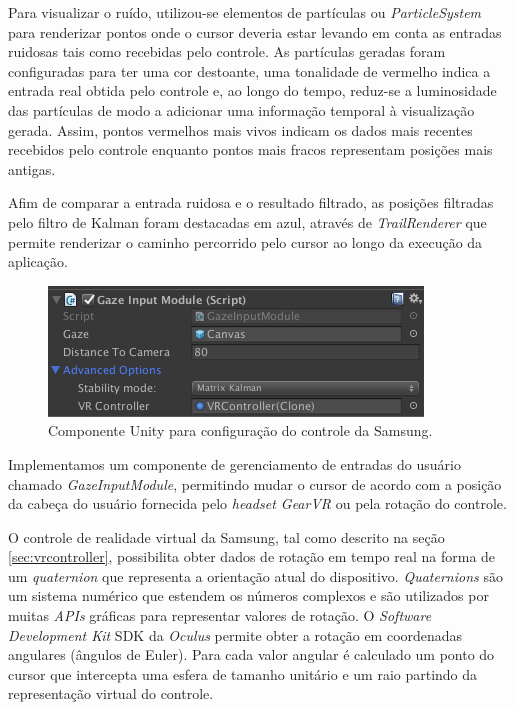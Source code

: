 \documentclass[conference]{IEEEtran}
\begin{document}
Para visualizar o ruído, utilizou-se elementos de partículas ou \textit{ParticleSystem} para renderizar pontos onde o cursor deveria estar levando em conta as entradas ruidosas tais como recebidas pelo controle. As partículas geradas foram configuradas para ter uma cor destoante, uma tonalidade de vermelho indica a entrada real obtida pelo controle e, ao longo do tempo, reduz-se a luminosidade das partículas de modo a adicionar uma informação temporal à visualização gerada. Assim, pontos vermelhos mais vivos indicam os dados mais recentes recebidos pelo controle enquanto pontos mais fracos representam posições mais antigas.

Afim de comparar a entrada ruidosa e o resultado filtrado, as posições filtradas pelo filtro de Kalman foram destacadas em azul, através de \textit{TrailRenderer} que permite renderizar o caminho percorrido pelo cursor ao longo da execução da aplicação.

\begin{figure}[ht]
\centering
\includegraphics[width=.5\textwidth]{images/controller_input.png}
\caption{Componente Unity para configuração do controle da Samsung.}
\label{fig:controllercomponent}
\end{figure}

Implementamos um componente de gerenciamento de entradas do usuário chamado \textit{GazeInputModule}, permitindo mudar o cursor de acordo com a posição da cabeça do usuário fornecida pelo \textit{headset GearVR} ou pela rotação do controle.


O controle de realidade virtual da Samsung, tal como descrito na seção \ref{sec:vrcontroller}, possibilita obter dados de rotação em tempo real \cite{gearvrinputdocs} na forma de um \textit{quaternion} \cite{quaternionhamilton1844ii} que representa a orientação atual do dispositivo. \textit{Quaternions} são um sistema numérico que estendem os números complexos e são utilizados por muitas \textit{APIs} gráficas para representar valores de rotação. O \textit{Software Development Kit} SDK da \textit{Oculus} permite obter a rotação em coordenadas angulares (ângulos de Euler). Para cada valor angular é calculado um ponto do cursor que intercepta uma esfera de tamanho unitário e um raio partindo da representação virtual do controle.
\end{document}
